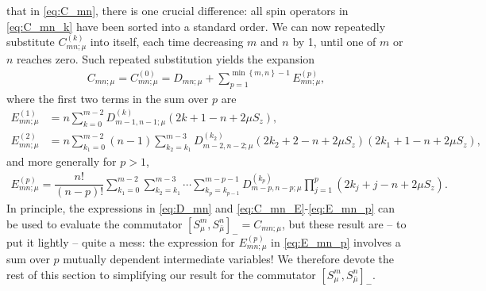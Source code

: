 \documentclass[aps,notitlepage,nofootinbib,11pt]{revtex4-1}
\newcommand{\f}[2]{\dfrac{#1}{#2}} %
\newcommand{\p}[1]{\left(#1\right)} %
\renewcommand{\sp}[1]{\left[#1\right]} %
\renewcommand{\set}[1]{\left\{#1\right\}} %
\newcommand{\bmu}{{\bar\mu}}
\newcommand{\1}{\mathds{1}}
\begin{document}
that in \eqref{eq:C_mn}, there is one crucial difference: all spin
operators in \eqref{eq:C_mn_k} have been sorted into a standard order.
We can now repeatedly substitute $C_{mn;\mu}^{(k)}$ into itself, each
time decreasing $m$ and $n$ by 1, until one of $m$ or $n$ reaches
zero.  Such repeated substitution yields the expansion
\begin{align}
  C_{mn;\mu}
  = C_{mn;\mu}^{(0)}
  = D_{mn;\mu}
  + \sum_{p=1}^{\min\set{m,n}-1} E_{mn;\mu}^{(p)},
  \label{eq:C_mn_E}
\end{align}
where the first two terms in the sum over $p$ are
\begin{align}
  E_{mn;\mu}^{(1)}
  &= n \sum_{k=0}^{m-2} D_{m-1,n-1;\mu}^{(k)}
  \p{2k+1-n+2\mu S_z}, \\
  E_{mn;\mu}^{(2)}
  &= n \sum_{k_1=0}^{m-2} \p{n-1} \sum_{k_2=k_1}^{m-3}
  D_{m-2,n-2;\mu}^{(k_2)}
  \p{2k_2+2-n+2\mu S_z} \p{2k_1+1-n+2\mu S_z},
\end{align}
and more generally for $p>1$,
\begin{align}
  E_{mn;\mu}^{(p)}
  = \f{n!}{\p{n-p}!}
  \sum_{k_1=0}^{m-2} \sum_{k_2=k_1}^{m-3} \cdots\sum_{k_p=k_{p-1}}^{m-p-1}
  D_{m-p,n-p;\mu}^{(k_p)} \prod_{j=1}^p \p{2k_j+j-n+2\mu S_z}.
  \label{eq:E_mn_p}
\end{align}
In principle, the expressions in \eqref{eq:D_mn} and
\eqref{eq:C_mn_E}-\eqref{eq:E_mn_p} can be used to evaluate the
commutator $\sp{S_\mu^m,S_\bmu^n}_- = C_{mn;\mu}$, but these result
are -- to put it lightly -- quite a mess: the expression for
$E_{mn;\mu}^{(p)}$ in \eqref{eq:E_mn_p} involves a sum over $p$
mutually dependent intermediate variables!  We therefore devote the
rest of this section to simplifying our result for the commutator
$\sp{S_\mu^m,S_\bmu^n}_-$.
\end{document}
